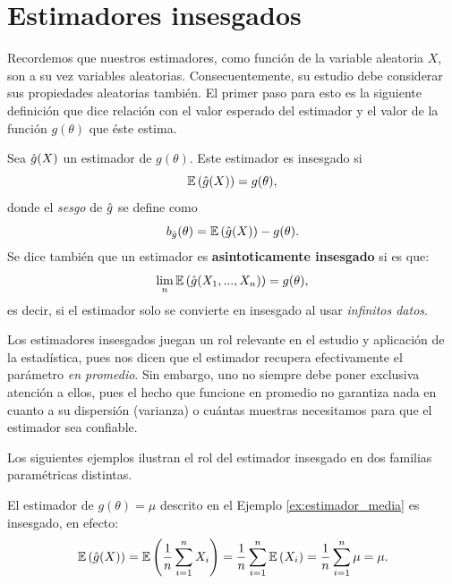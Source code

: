 \section{Estimadores insesgados} 
Recordemos que nuestros estimadores, como función de la variable aleatoria $X$, son a su vez variables aleatorias. Consecuentemente, su estudio debe considerar sus propiedades aleatorias también. El primer paso para esto es la siguiente definición que dice relación con el valor esperado del estimador y el valor de la función $g(\theta)$ que éste estima. 

\begin{definition}
	\label{def:estimador_insesgado}
	Sea ${ \hat{g}(X)}$ un estimador de $g(\theta)$. Este estimador es insesgado si 
	\begin{equation}
	\nonumber
		\mathbb{E} \left({ \hat{g}(X)}\right) = g(\theta),
	\end{equation}
	donde el \emph{sesgo} de ${ \hat{g}}$ se define como 
	\begin{equation}
	\nonumber
		b_{ \hat{g}}(\theta) = \mathbb{E} \left({ \hat{g}(X)}\right) - g(\theta).
	\end{equation}
	Se dice también que un estimador es \textbf{asintoticamente insesgado} si es que:
	\[\lim_n\mathbb{E} \left({ \hat{g}} (X_1,...,X_n)\right) = g(\theta),\]
	es decir, si el estimador solo se convierte en insesgado al usar \emph{infinitos datos}.
\end{definition}

Los estimadores insesgados juegan un rol relevante en el estudio y aplicación de la estadística, pues nos dicen que el estimador recupera efectivamente el parámetro \emph{en promedio}. Sin embargo, uno no siempre debe poner exclusiva atención a ellos, pues el hecho que funcione en promedio no garantiza nada en cuanto a su dispersión (varianza) o cuántas muestras necesitamos para que el estimador sea confiable. 

Los siguientes ejemplos ilustran el rol del estimador insesgado en dos familias paramétricas distintas. 

\begin{example}
	\label{ex:estimador_in_media}
	El estimador de $g(\theta) =  \mu$ descrito en el Ejemplo \ref{ex:estimador_media} es insesgado, en efecto: 
	\begin{equation}
	\nonumber
		\mathbb{E} \left({ \hat{g}(X)}\right) = \mathbb{E} \left(\frac{1}{n}\sum_{i=1}^nX_i\right)	= \frac{1}{n}\sum_{i=1}^n\mathbb{E} \left(X_i\right)		= \frac{1}{n}\sum_{i=1}^n\mu = \mu.
	\end{equation}
\end{example}




